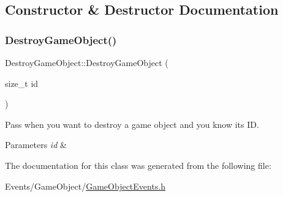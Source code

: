 \subsection{Constructor \& Destructor Documentation}
\mbox{\label{classDestroyGameObject_a4ad0cb0d8adb8251c74b49ea99c282ad}} 
\subsubsection{\texorpdfstring{Destroy\+Game\+Object()}{DestroyGameObject()}}
{\footnotesize\ttfamily Destroy\+Game\+Object\+::\+Destroy\+Game\+Object (\begin{DoxyParamCaption}\item[{size\+\_\+t}]{id }\end{DoxyParamCaption})\hspace{0.3cm}{\ttfamily [inline]}}



Pass when you want to destroy a game object and you know it\textquotesingle{}s ID. 


\begin{DoxyParams}{Parameters}
{\em id} & \\
\hline
\end{DoxyParams}


The documentation for this class was generated from the following file\+:\begin{DoxyCompactItemize}
\item 
Events/\+Game\+Object/\hyperlink{GameObjectEvents_8h}{Game\+Object\+Events.\+h}\end{DoxyCompactItemize}

